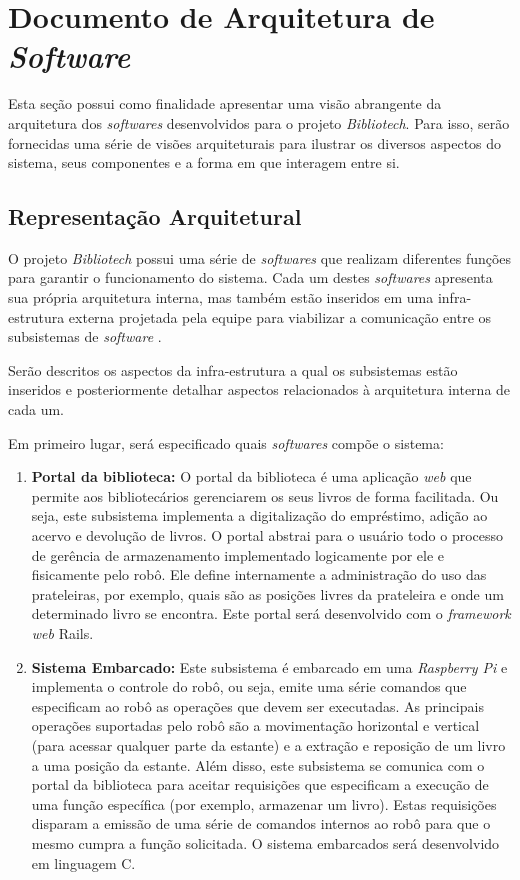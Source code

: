 \chapter[Documento de Arquitetura de Software]{Documento de Arquitetura de \textit{Software}}
Esta seção possui como finalidade apresentar uma visão abrangente da arquitetura dos \textit{softwares} desenvolvidos para o projeto \textit{Bibliotech}. Para isso, serão fornecidas uma série de visões arquiteturais para ilustrar os diversos aspectos do sistema, seus componentes e a forma em que interagem entre si.

\section{Representação Arquitetural}
O projeto \textit{Bibliotech} possui uma série de \textit{softwares} que realizam diferentes funções para garantir o funcionamento do sistema. Cada um destes \textit{softwares} apresenta sua própria arquitetura interna, mas também estão inseridos em uma infra-estrutura externa projetada pela equipe para viabilizar a comunicação entre os subsistemas de \textit{software} . 

Serão descritos os aspectos da infra-estrutura a qual os subsistemas estão inseridos e posteriormente detalhar aspectos relacionados à arquitetura interna de cada um.

Em primeiro lugar, será especificado quais \textit{softwares} compõe o sistema:

\begin{enumerate}
    \item\textbf{Portal da biblioteca:} O portal da biblioteca é uma aplicação \textit{web} que permite aos bibliotecários gerenciarem os seus livros de forma facilitada. Ou seja, este subsistema implementa a digitalização do empréstimo, adição ao acervo e devolução de livros. O portal abstrai para o usuário todo o processo de gerência de armazenamento implementado logicamente por ele e fisicamente pelo robô. Ele define internamente a administração do uso das prateleiras, por exemplo, quais são as posições livres da prateleira e onde um determinado livro se encontra. Este portal será desenvolvido com o \textit{framework} \textit{web} Rails.

    \item\textbf{Sistema Embarcado:} Este subsistema é embarcado em uma \textit{Raspberry Pi} e implementa o controle do robô, ou seja, emite uma série comandos que especificam ao robô as operações que devem ser executadas. As principais operações suportadas pelo robô são a movimentação horizontal e vertical (para acessar qualquer parte da estante) e a extração e reposição de um livro a uma posição da estante. Além disso, este subsistema se comunica com o portal da biblioteca para aceitar requisições que especificam a execução de uma função específica (por exemplo, armazenar um livro). Estas requisições disparam a emissão de uma série de comandos internos ao robô para que o mesmo cumpra a função solicitada. O sistema embarcados será desenvolvido em linguagem C.
\end{enumerate}

